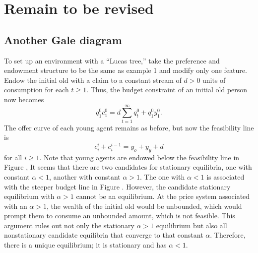 








\section{Remain to be revised}

%
\subsection{Another Gale diagram}\label{sec:olg_lucas_tree}%
To set up an environment with a ``Lucas tree,'' take the preference and endowment
structure to be the same as example 1 and modify only one feature.
Endow the initial old with a claim
to a constant stream of $d >0$ units of consumption for each
$t\geq 1$.
%
%
   Thus, the budget constraint of an initial old person now becomes
$$ q_1^0 c_1^0 = d \sum_{t=1}^\infty q_t^0 + q_1^0 y_1^0. $$
The offer curve of each young agent remains as before,
but now the feasibility line is
$$ c_i^i + c^{i-1}_i =  y_o + y_y + d $$
for all $i \geq 1$.  Note that young agents are  endowed
below the feasibility line in  Figure , %
It seems that there
are  two candidates for stationary equilibria, one
with constant  $\alpha < 1$, another with constant $\alpha >1$.
The one with $\alpha  <1$ is associated with the
steeper budget line in Figure . %
 However, the candidate stationary
equilibrium with $ \alpha >1 $ cannot be an equilibrium. %
 At the price
system associated with an $\alpha >1$, the wealth of the initial
old would be unbounded, which would prompt them to consume an
unbounded amount, which is not feasible.
This argument rules out not only the stationary $\alpha >1$ equilibrium
but also all nonstationary candidate equilibria that converge to
that constant $\alpha$.  Therefore, there is a unique equilibrium;
it is stationary and has $\alpha < 1$.

